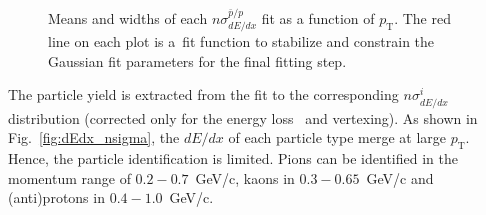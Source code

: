 \begin{figure}[h!]
\begin{subfigure}{.32\textwidth}
		\end{subfigure}
	\caption{Means and widths  of each $n\sigma^{\bar{p}/p}_{dE/dx}$ fit as a function of $p_\textrm{T}$.  The red line on each plot is a~fit function to stabilize and constrain the Gaussian fit parameters for the final fitting step.}
	\label{fig:dEdx_fit_parameters_P}
	
\end{figure}


The particle yield is extracted from the fit to the corresponding
$n\sigma^{i}_{dE/dx}$  distribution (corrected only for the energy loss~\cite{supplementaryNote} and vertexing). As shown in Fig.~\ref{fig:dEdx_nsigma}, the $dE/dx$ of each particle type merge at large $p_\textrm{T}$. Hence, the particle identification is limited. Pions can be identified
in the momentum range of $0.2-0.7$~GeV/c, kaons in
$0.3-0.65$~GeV/c and (anti)protons in $0.4-1.0$~GeV/c. 
